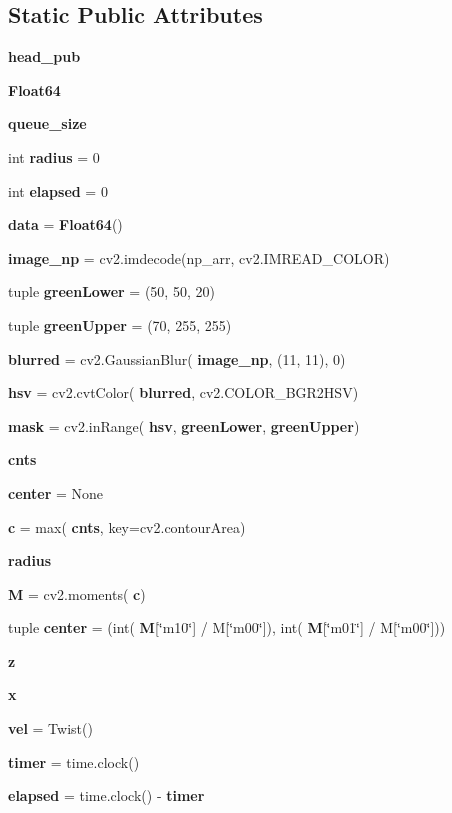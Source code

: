 \subsection*{Static Public Attributes}
\begin{DoxyCompactItemize}
\item 
\textbf{ head\+\_\+pub}
\item 
\textbf{ Float64}
\item 
\textbf{ queue\+\_\+size}
\item 
int \textbf{ radius} = 0
\item 
int \textbf{ elapsed} = 0
\item 
\textbf{ data} = \textbf{ Float64}()
\item 
\textbf{ image\+\_\+np} = cv2.\+imdecode(np\+\_\+arr, cv2.\+I\+M\+R\+E\+A\+D\+\_\+\+C\+O\+L\+OR)
\item 
tuple \textbf{ green\+Lower} = (50, 50, 20)
\item 
tuple \textbf{ green\+Upper} = (70, 255, 255)
\item 
\textbf{ blurred} = cv2.\+Gaussian\+Blur(\textbf{ image\+\_\+np}, (11, 11), 0)
\item 
\textbf{ hsv} = cv2.\+cvt\+Color(\textbf{ blurred}, cv2.\+C\+O\+L\+O\+R\+\_\+\+B\+G\+R2\+H\+SV)
\item 
\textbf{ mask} = cv2.\+in\+Range(\textbf{ hsv}, \textbf{ green\+Lower}, \textbf{ green\+Upper})
\item 
\textbf{ cnts}
\item 
\textbf{ center} = None
\item 
\textbf{ c} = max(\textbf{ cnts}, key=cv2.\+contour\+Area)
\item 
\textbf{ radius}
\item 
\textbf{ M} = cv2.\+moments(\textbf{ c})
\item 
tuple \textbf{ center} = (int(\textbf{ M}[\char`\"{}m10\char`\"{}] / M[\char`\"{}m00\char`\"{}]), int(\textbf{ M}[\char`\"{}m01\char`\"{}] / M[\char`\"{}m00\char`\"{}]))
\item 
\textbf{ z}
\item 
\textbf{ x}
\item 
\textbf{ vel} = Twist()
\item 
\textbf{ timer} = time.\+clock()
\item 
\textbf{ elapsed} = time.\+clock() -\/ \textbf{ timer}
\end{DoxyCompactItemize}


